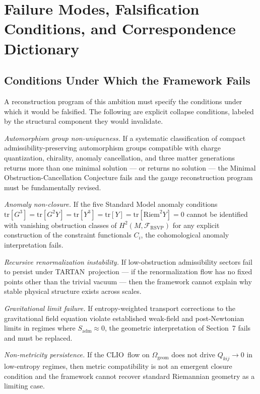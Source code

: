 \documentclass[12pt,a4paper]{article}
\newcommand{\RSVP}{\textrm{RSVP}}
\newcommand{\CLIO}{\textrm{CLIO}}
\newcommand{\TARTAN}{\textrm{TARTAN}}
\newcommand{\Sheaf}{\mathcal{F}}
\begin{document}
\section{Failure Modes, Falsification Conditions, and Correspondence Dictionary}

\subsection{Conditions Under Which the Framework Fails}

A reconstruction program of this ambition must specify the conditions under
which it would be falsified. The following are explicit collapse conditions,
labeled by the structural component they would invalidate.

\textit{Automorphism group non-uniqueness.} If a systematic classification of
compact admissibility-preserving automorphism groups compatible with charge
quantization, chirality, anomaly cancellation, and three matter generations
returns more than one minimal solution --- or returns no solution --- the
Minimal Obstruction-Cancellation Conjecture fails and the gauge reconstruction
program must be fundamentally revised.

\textit{Anomaly non-closure.} If the five Standard Model anomaly conditions
$\mathrm{tr}[G^3]=\mathrm{tr}[G^2Y]=\mathrm{tr}[Y^3]=\mathrm{tr}[Y]=
\mathrm{tr}[\mathrm{Riem}^2Y]=0$ cannot be identified with vanishing obstruction
classes of $H^2(M,\Sheaf_\RSVP)$ for any explicit construction of the constraint
functionals $C_i$, the cohomological anomaly interpretation fails.

\textit{Recursive renormalization instability.} If low-obstruction admissibility
sectors fail to persist under \TARTAN\ projection --- if the renormalization flow
has no fixed points other than the trivial vacuum --- then the framework cannot
explain why stable physical structure exists across scales.

\textit{Gravitational limit failure.} If entropy-weighted transport corrections
to the gravitational field equation violate established weak-field and
post-Newtonian limits in regimes where $S_\mathrm{adm}\approx 0$, the geometric
interpretation of Section~7 fails and must be replaced.

\textit{Non-metricity persistence.} If the \CLIO\ flow on $\Omega_\mathrm{geom}$
does not drive $Q_{kij}\to 0$ in low-entropy regimes, then metric compatibility
is not an emergent closure condition and the framework cannot recover standard
Riemannian geometry as a limiting case.
\end{document}
